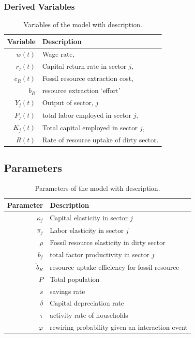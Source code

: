 \subsubsection{Derived Variables}

\begin{table}[H]
	\centering
	\begin{tabular}{r|l}
		Variable & Description \\\hline
		$w(t)$   & Wage rate, \\
		$r_j(t)$ & Capital return rate in sector $j$, \\
		$c_R(t)$ & Fossil resource extraction cost, \\
		$b_R$	 & resource extraction `effort'\\
		$Y_j(t)$ & Output of sector, $j$ \\
		$P_j(t)$ & total labor employed in sector $j$, \\
		$K_j(t)$ & Total capital employed in sector $j$, \\
		$R(t)$ & Rate of resource uptake of dirty sector. \\
	\end{tabular}
	\caption{Variables of the model with description.}
	\label{tab:derived_variables}
 \end{table}

\subsection{Parameters}

\begin{table}[H]
	\centering
	\begin{tabular}{r|l}
		Parameter & Description \\\hline
		$\kappa_j$ & Capital elasticity in sector $j$ \\
		$\pi_j$ & Labor elasticity in sector $j$ \\
		$\rho$ & Fossil resource elasticity in dirty sector \\
		$b_j$ & total factor productivity in sector $j$ \\
		$\tilde{b}_R$ & resource uptake efficiency for fossil resource \\
		$P$ & Total population \\
		$s$ & savings rate \\
		$\delta $ & Capital depreciation rate \\
		$\tau$ & activity rate of households \\
		$\varphi$ & rewiring probability given an interaction event
	\end{tabular}
	\caption{Parameters of the model with description.}
	\label{tab:parameters}
\end{table}
 
